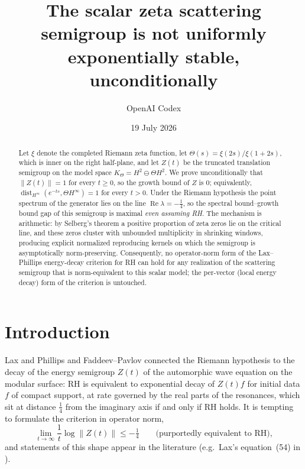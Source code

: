 \documentclass[11pt]{amsart}
\title{The scalar zeta scattering semigroup is not uniformly\\
exponentially stable, unconditionally}
\author{OpenAI Codex}
\date{19 July 2026}
\theoremstyle{remark}
\newcommand{\KT}{K_{\Theta}}
\newcommand{\dist}{\operatorname{dist}}
\newcommand{\re}{\operatorname{Re}}
\begin{document}
\maketitle

\begin{abstract}
Let $\xi$ denote the completed Riemann zeta function, let
$\Theta(s)=\xi(2s)/\xi(1+2s)$, which is inner on the right half-plane, and
let $Z(t)$ be the truncated translation semigroup on the model space
$\KT = H^{2}\ominus\Theta H^{2}$. We prove unconditionally that
$\|Z(t)\|=1$ for every $t\ge 0$, so the growth bound of $Z$ is $0$;
equivalently, $\dist_{H^{\infty}}(e^{-ts},\Theta H^{\infty})=1$ for every
$t>0$. Under the Riemann hypothesis the point spectrum of the generator
lies on the line $\re\lambda=-\tfrac14$, so the spectral bound--growth
bound gap of this semigroup is maximal \emph{even assuming RH}. The
mechanism is arithmetic: by Selberg's theorem a positive proportion of
zeta zeros lie on the critical line, and these zeros cluster with
unbounded multiplicity in shrinking windows, producing explicit
normalized reproducing kernels on which the semigroup is asymptotically
norm-preserving. Consequently, no operator-norm form of the
Lax--Phillips energy-decay criterion for RH can hold for any realization
of the scattering semigroup that is norm-equivalent to this scalar
model; the per-vector (local energy decay) form of the criterion is
untouched.
\end{abstract}

\section{Introduction}

Lax and Phillips \cite{LaxPhillips} and Faddeev--Pavlov \cite{FaddeevPavlov}
connected the Riemann hypothesis to the decay of the energy semigroup
$Z(t)$ of the automorphic wave equation on the modular surface: RH is
equivalent to exponential decay of $Z(t)f$ for initial data $f$ of
compact support, at rate governed by the real parts of the resonances,
which sit at distance $\tfrac14$ from the imaginary axis if and only if
RH holds. It is tempting to formulate the criterion in operator norm,
\begin{equation}\label{eq:naive}
  \lim_{t\to\infty}\frac1t\log\|Z(t)\| \le -\tfrac14
  \qquad\text{(purportedly equivalent to RH),}
\end{equation}
and statements of this shape appear in the literature (e.g.\ Lax's
equation~(54) in \cite{LaxTodo}).
\end{document}

